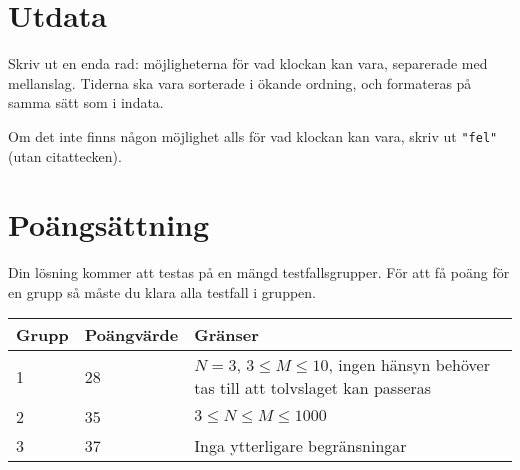 \section*{Utdata}
Skriv ut en enda rad: möjligheterna för vad klockan kan vara, separerade med mellanslag.
Tiderna ska vara sorterade i ökande ordning, och formateras på samma sätt som i indata.

Om det inte finns någon möjlighet alls för vad klockan kan vara, skriv ut \texttt{"fel"} (utan citattecken).

\section*{Poängsättning}
Din lösning kommer att testas på en mängd testfallsgrupper. För att få poäng för en grupp så måste du klara alla testfall i gruppen.\\

\noindent
\begin{tabular}{| l | l | l |}
\hline
Grupp & Poängvärde & Gränser \\ \hline
1     & 28         &  $N = 3$, $3 \le M \le 10$, ingen hänsyn behöver tas till att tolvslaget kan passeras \\ \hline
2     & 35         &  $3 \le N \le M \le 1000$ \\ \hline
3     & 37         & Inga ytterligare begränsningar \\ \hline
\end{tabular}
